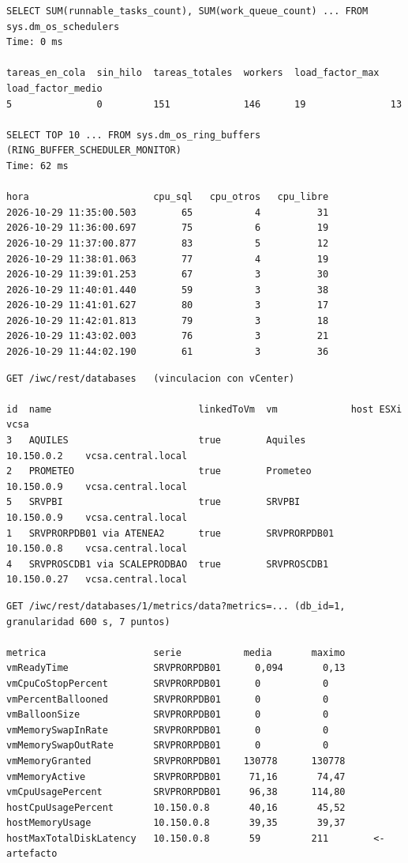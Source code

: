 \documentclass[11pt,a4paper]{article}
\begin{document}
\begin{lstlisting}[style=salida]
SELECT SUM(runnable_tasks_count), SUM(work_queue_count) ... FROM sys.dm_os_schedulers
Time: 0 ms

tareas_en_cola  sin_hilo  tareas_totales  workers  load_factor_max  load_factor_medio
5               0         151             146      19               13

SELECT TOP 10 ... FROM sys.dm_os_ring_buffers (RING_BUFFER_SCHEDULER_MONITOR)
Time: 62 ms

hora                      cpu_sql   cpu_otros   cpu_libre
2026-10-29 11:35:00.503        65           4          31
2026-10-29 11:36:00.697        75           6          19
2026-10-29 11:37:00.877        83           5          12
2026-10-29 11:38:01.063        77           4          19
2026-10-29 11:39:01.253        67           3          30
2026-10-29 11:40:01.440        59           3          38
2026-10-29 11:41:01.627        80           3          17
2026-10-29 11:42:01.813        79           3          18
2026-10-29 11:43:02.003        76           3          21
2026-10-29 11:44:02.190        61           3          36
\end{lstlisting}

\begin{lstlisting}[style=salida]
GET /iwc/rest/databases   (vinculacion con vCenter)

id  name                          linkedToVm  vm             host ESXi     vcsa
3   AQUILES                       true        Aquiles        10.150.0.2    vcsa.central.local
2   PROMETEO                      true        Prometeo       10.150.0.9    vcsa.central.local
5   SRVPBI                        true        SRVPBI         10.150.0.9    vcsa.central.local
1   SRVPRORPDB01 via ATENEA2      true        SRVPRORPDB01   10.150.0.8    vcsa.central.local
4   SRVPROSCDB1 via SCALEPRODBAO  true        SRVPROSCDB1    10.150.0.27   vcsa.central.local
\end{lstlisting}

\begin{lstlisting}[style=salida]
GET /iwc/rest/databases/1/metrics/data?metrics=... (db_id=1, granularidad 600 s, 7 puntos)

metrica                   serie           media       maximo
vmReadyTime               SRVPRORPDB01      0,094       0,13
vmCpuCoStopPercent        SRVPRORPDB01      0           0
vmPercentBallooned        SRVPRORPDB01      0           0
vmBalloonSize             SRVPRORPDB01      0           0
vmMemorySwapInRate        SRVPRORPDB01      0           0
vmMemorySwapOutRate       SRVPRORPDB01      0           0
vmMemoryGranted           SRVPRORPDB01    130778      130778
vmMemoryActive            SRVPRORPDB01     71,16       74,47
vmCpuUsagePercent         SRVPRORPDB01     96,38      114,80
hostCpuUsagePercent       10.150.0.8       40,16       45,52
hostMemoryUsage           10.150.0.8       39,35       39,37
hostMaxTotalDiskLatency   10.150.0.8       59         211        <- artefacto
\end{lstlisting}
\end{document}
